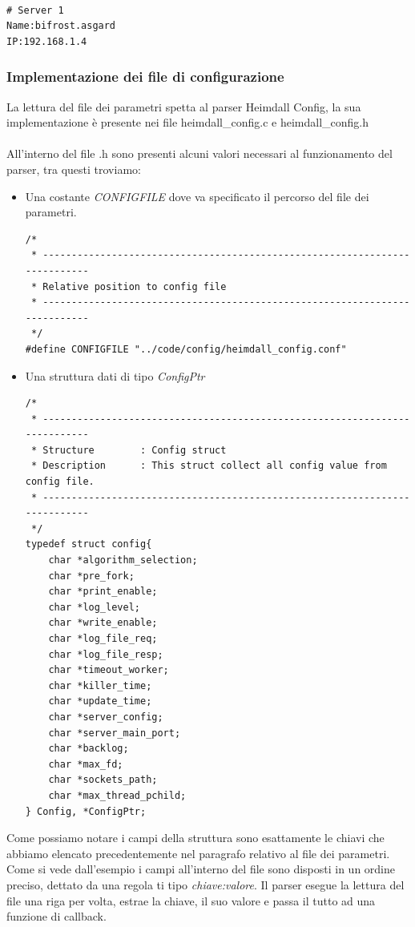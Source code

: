 \documentclass[italian]{tktltiki2}
\begin{document}
\begin{lstlisting}

# Server 1
Name:bifrost.asgard
IP:192.168.1.4

\end{lstlisting}

\subsubsection{Implementazione dei file di configurazione}
\label{ssec:file_config_impl}

La lettura del file dei parametri spetta al parser Heimdall Config, la sua implementazione è presente nei file heimdall\_config.c e heimdall\_config.h \\\\ All'interno del file .h sono presenti alcuni valori necessari al funzionamento del parser, tra questi troviamo:

\begin{itemize}

\item Una costante \emph{CONFIGFILE} dove va specificato il percorso del file dei parametri.
	
\begin{lstlisting}
/*
 * ---------------------------------------------------------------------------
 * Relative position to config file
 * ---------------------------------------------------------------------------
 */
#define CONFIGFILE "../code/config/heimdall_config.conf"
\end{lstlisting}
	
\item Una struttura dati di tipo \emph{ConfigPtr}

\begin{lstlisting}
/*
 * ---------------------------------------------------------------------------
 * Structure        : Config struct
 * Description      : This struct collect all config value from config file.
 * ---------------------------------------------------------------------------
 */
typedef struct config{
    char *algorithm_selection;
    char *pre_fork;
    char *print_enable;
    char *log_level;
    char *write_enable;
    char *log_file_req;
    char *log_file_resp;
    char *timeout_worker;
    char *killer_time;
    char *update_time;
    char *server_config;
    char *server_main_port;
    char *backlog;
    char *max_fd;
    char *sockets_path;
    char *max_thread_pchild;
} Config, *ConfigPtr;	
\end{lstlisting}

\end{itemize}
Come possiamo notare i campi della struttura sono esattamente le chiavi che abbiamo elencato precedentemente nel paragrafo relativo al file dei parametri. Come si vede dall'esempio i campi all'interno del file sono disposti in un ordine preciso, dettato da una regola ti tipo \emph{chiave:valore}. Il parser esegue la lettura del file una riga per volta, estrae la chiave, il suo valore e passa il tutto ad una funzione di callback.
\end{document}
